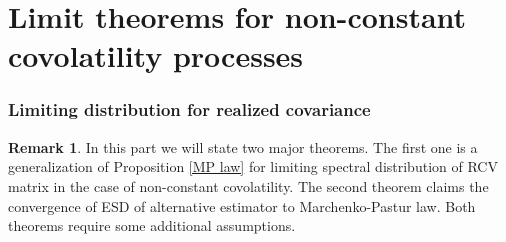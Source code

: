 \documentclass[a4paper,11pt]{article}
\theoremstyle{plain}
\theoremstyle{definition}
\newtheorem{rmrk}[thm]{Remark}
\begin{document}
    \pagebreak
    \part{Limit theorems for non-constant covolatility processes}
    
    \section*{Limiting distribution for realized covariance}
    \begin{rmrk}
    	In this part we will state two major theorems. The first one is a generalization of Proposition \ref{MP law} for limiting spectral distribution of RCV matrix in the case of non-constant covolatility. The second theorem claims the convergence of ESD of alternative estimator to Marchenko-Pastur law. Both theorems require some additional assumptions.
    \end{rmrk}
    
\end{document}
